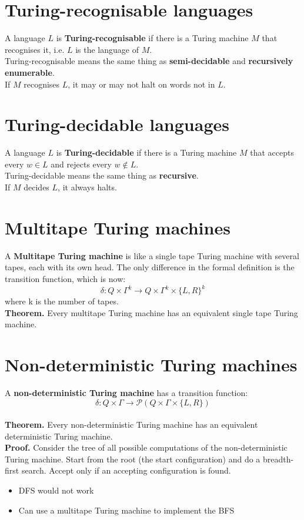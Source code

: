 \documentclass{article}
\begin{document}
\section{Turing-recognisable languages}
A language $L$ is \textbf{Turing-recognisable} if there is a Turing machine $M$ that recognises it, i.e. $L$ is the language of $M$.
\\Turing-recognisable means the same thing as \textbf{semi-decidable} and \textbf{recursively enumerable}.\medskip
\\ If $M$ recognises $L$, it may or may not halt on words not in $L$.

\section{Turing-decidable languages}
A language $L$ is \textbf{Turing-decidable} if there is a Turing machine $M$ that accepts every $w \in L$ and rejects every $w \notin L$.
\\ Turing-decidable means the same thing as \textbf{recursive}.\medskip
\\If $M$ decides $L$, it always halts.

\section{Multitape Turing machines}
A \textbf{Multitape Turing machine} is like a single tape Turing machine with several tapes, each with its own head. The only difference in the formal definition is the transition function, which is now:
$$\delta: Q \times \Gamma^k \rightarrow Q \times \Gamma^k \times \{L, R\}^k$$
where k is the number of tapes.\medskip
\\\textbf{Theorem.} Every multitape Turing machine has an equivalent single tape Turing machine.

\section{Non-deterministic Turing machines}
A \textbf{non-deterministic Turing machine} has a transition function:
$$\delta: Q \times \Gamma \rightarrow \mathcal{P}(Q \times \Gamma \times \{L, R\})$$
\\\textbf{Theorem.} Every non-deterministic Turing machine has an equivalent deterministic Turing machine.
\\\textbf{Proof.} Consider the tree of all possible computations of the non-deterministic Turing machine. Start from the root (the start configuration) and do a breadth-first search. Accept only if an accepting configuration is found.
\begin{itemize}
	\item{DFS would not work}
	\item{Can use a multitape Turing machine to implement the BFS}
\end{itemize}
\end{document}
